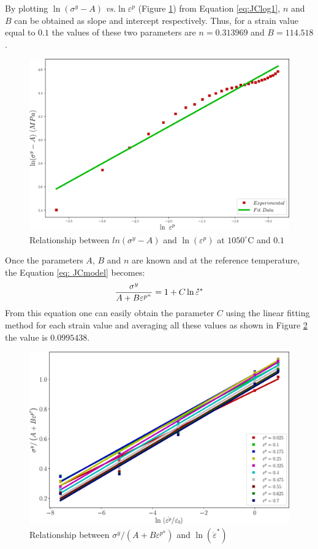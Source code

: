 \documentclass[twoside,english,1p,final,sort&compress]{elsarticle}
\makeatletter
\theoremstyle{plain}
\newcommand{\mdot}[1]{\accentset{\mbox{\bfseries .}}{#1}}
\newcommand*{\versus}{\emph{vs.}\@\xspace}
\makeatother
\begin{document}
By plotting $\ln(\sigma^y-A)$ \versus $\ln\varepsilon^p$ (Figure \ref{fig:JCSigmaAB}) from Equation \ref{eq:JClog1}, $n$ and $B$ can be obtained as slope and intercept respectively. Thus, for a strain value equal to $0.1$ the values of these two parameters are $n=0.313969$ and $B=114.518$.
\begin{figure}[!ht]
\centering
\includegraphics[width=0.9\columnwidth]
{Figures/JCSigmaAB}
\caption{Relationship between $ln(\sigma^y -A)$ and $\ln(\varepsilon^p)$ at $1050^\circ$C and $0.1$}
\label{fig:JCSigmaAB}
\end{figure}
\FloatBarrier
Once the parameters $A$, $B$ and $n$ are known and at the reference temperature, the Equation \ref{eq: JCmodel} becomes:
\begin{equation}
\frac{\sigma^y}{A + B\varepsilon^{p^n}} = 1 + C\ln\mdot{\varepsilon}^*
\end{equation}
From this equation one can easily obtain the parameter $C$ using the linear fitting method for each strain value and averaging all these values as shown in Figure \ref{fig:JCSigmaAB1} the value is $0.0995438$.
\begin{figure}[!ht]
\centering
\includegraphics[width=0.9\columnwidth]
{Figures/JCSigmaAB1}
\caption{Relationship between $\sigma^y/(A+ B\varepsilon^{p^n})$ and $\ln(\dot{\varepsilon}^*)$}
\label{fig:JCSigmaAB1}
\end{figure}
\end{document}
